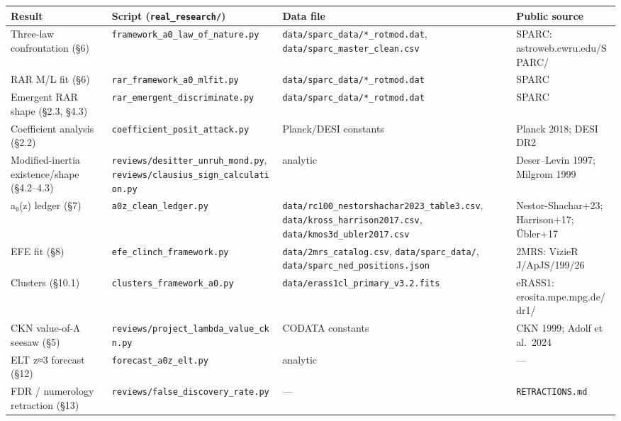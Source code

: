 \documentclass[
]{article}
\newcounter{none} %
\begin{document}
{\def\LTcaptype{none} %
\begin{longtable}[]{@{}
  >{\raggedright\arraybackslash}p{}
  >{\raggedright\arraybackslash}p{}
  >{\raggedright\arraybackslash}p{}
  >{\raggedright\arraybackslash}p{}@{}}
\toprule\noalign{}
\begin{minipage}[b]{\linewidth}\raggedright
Result
\end{minipage} & \begin{minipage}[b]{\linewidth}\raggedright
Script (\texttt{real\_research/})
\end{minipage} & \begin{minipage}[b]{\linewidth}\raggedright
Data file
\end{minipage} & \begin{minipage}[b]{\linewidth}\raggedright
Public source
\end{minipage} \\
\midrule\noalign{}
\endhead
\bottomrule\noalign{}
\endlastfoot
Three-law confrontation (§6) &
\texttt{framework\_a0\_law\_of\_nature.py} &
\texttt{data/sparc\_data/*\_rotmod.dat},
\texttt{data/sparc\_master\_clean.csv} & SPARC:
astroweb.cwru.edu/SPARC/ \\
RAR M/L fit (§6) & \texttt{rar\_framework\_a0\_mlfit.py} &
\texttt{data/sparc\_data/*\_rotmod.dat} & SPARC \\
Emergent RAR shape (§2.3, §4.3) &
\texttt{rar\_emergent\_discriminate.py} &
\texttt{data/sparc\_data/*\_rotmod.dat} & SPARC \\
Coefficient analysis (§2.2) & \texttt{coefficient\_posit\_attack.py} &
Planck/DESI constants & Planck 2018; DESI DR2 \\
Modified-inertia existence/shape (§4.2--4.3) &
\texttt{reviews/desitter\_unruh\_mond.py},
\texttt{reviews/clausius\_sign\_calculation.py} & analytic &
Deser--Levin 1997; Milgrom 1999 \\
a₀(z) ledger (§7) & \texttt{a0z\_clean\_ledger.py} &
\texttt{data/rc100\_nestorshachar2023\_table3.csv},
\texttt{data/kross\_harrison2017.csv},
\texttt{data/kmos3d\_ubler2017.csv} & Nestor-Shachar+23; Harrison+17;
Übler+17 \\
EFE fit (§8) & \texttt{efe\_clinch\_framework.py} &
\texttt{data/2mrs\_catalog.csv}, \texttt{data/sparc\_data/},
\texttt{data/sparc\_ned\_positions.json} & 2MRS: VizieR J/ApJS/199/26 \\
Clusters (§10.1) & \texttt{clusters\_framework\_a0.py} &
\texttt{data/erass1cl\_primary\_v3.2.fits} & eRASS1:
erosita.mpe.mpg.de/dr1/ \\
CKN value-of-Λ seesaw (§5) &
\texttt{reviews/project\_lambda\_value\_ckn.py} & CODATA constants & CKN
1999; Adolf et al.~2024 \\
ELT z≈3 forecast (§12) & \texttt{forecast\_a0z\_elt.py} & analytic &
--- \\
FDR / numerology retraction (§13) &
\texttt{reviews/false\_discovery\_rate.py} & --- &
\texttt{RETRACTIONS.md} \\
\end{longtable}
}
\end{document}
